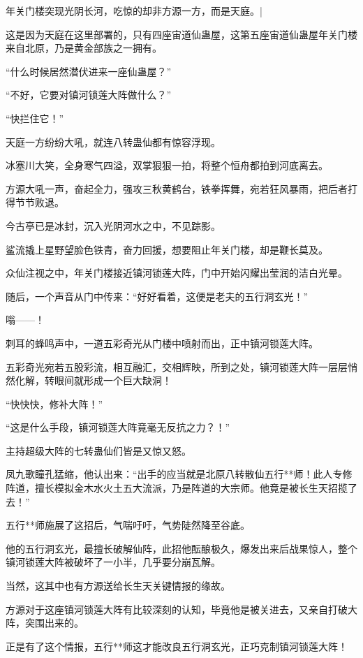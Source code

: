 
\begin{this_body}

年关门楼突现光阴长河，吃惊的却非方源一方，而是天庭。|

这是因为天庭在这里部署的，只有四座宙道仙蛊屋，这第五座宙道仙蛊屋年关门楼来自北原，乃是黄金部族之一拥有。

“什么时候居然潜伏进来一座仙蛊屋？”

“不好，它要对镇河锁莲大阵做什么？”

“快拦住它！”

天庭一方纷纷大吼，就连八转蛊仙都有惊容浮现。

冰塞川大笑，全身寒气四溢，双掌狠狠一拍，将整个恒舟都拍到河底离去。

方源大吼一声，奋起全力，强攻三秋黄鹤台，铁拳挥舞，宛若狂风暴雨，把后者打得节节败退。

今古亭已是冰封，沉入光阴河水之中，不见踪影。

鲨流撬上星野望脸色铁青，奋力回援，想要阻止年关门楼，却是鞭长莫及。

众仙注视之中，年关门楼接近镇河锁莲大阵，门中开始闪耀出莹润的洁白光晕。

随后，一个声音从门中传来：“好好看着，这便是老夫的五行洞玄光！”

嗡——！

刺耳的蜂鸣声中，一道五彩奇光从门楼中喷射而出，正中镇河锁莲大阵。

五彩奇光宛若五股彩流，相互融汇，交相辉映，所到之处，镇河锁莲大阵一层层悄然化解，转眼间就形成一个巨大缺洞！

“快快快，修补大阵！”

“这是什么手段，镇河锁莲大阵竟毫无反抗之力？！”

主持超级大阵的七转蛊仙们皆是又惊又怒。

凤九歌瞳孔猛缩，他认出来：“出手的应当就是北原八转散仙五行**师！此人专修阵道，擅长模拟金木水火土五大流派，乃是阵道的大宗师。他竟是被长生天招揽了去！”

五行**师施展了这招后，气喘吁吁，气势陡然降至谷底。

他的五行洞玄光，最擅长破解仙阵，此招他酝酿极久，爆发出来后战果惊人，整个镇河锁莲大阵被破坏了一小半，几乎要分崩瓦解。

当然，这其中也有方源送给长生天关键情报的缘故。

方源对于这座镇河锁莲大阵有比较深刻的认知，毕竟他是被关进去，又亲自打破大阵，突围出来的。

正是有了这个情报，五行**师这才能改良五行洞玄光，正巧克制镇河锁莲大阵！


\end{this_body}
